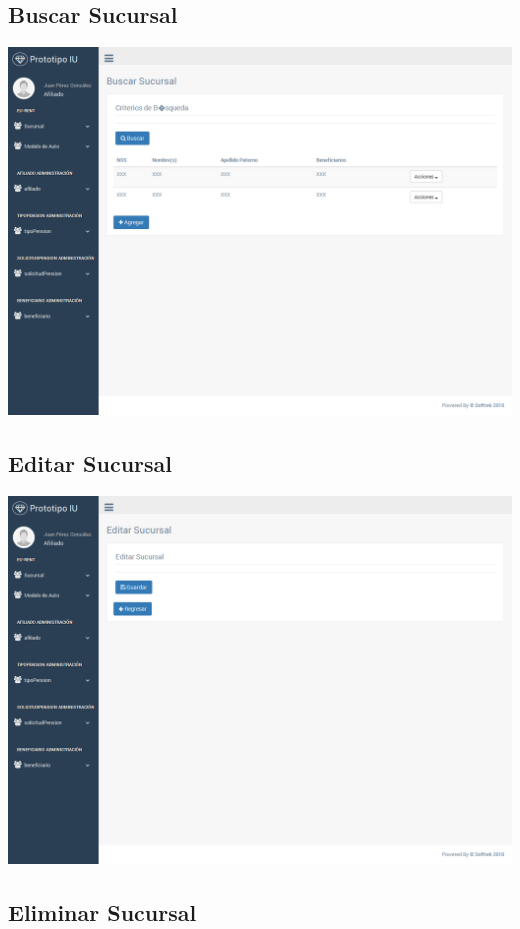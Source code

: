\documentclass[10pt, letterpaper]{report}
\begin{document}
\subsection{Buscar Sucursal}

\includegraphics[width=\linewidth]{ui-prototype/SucursalServices/BuscarSucursalPage.png}

\subsection{Editar Sucursal}

\includegraphics[width=\linewidth]{ui-prototype/SucursalServices/EditarSucursalPage.png}

\subsection{Eliminar Sucursal}
\end{document}
